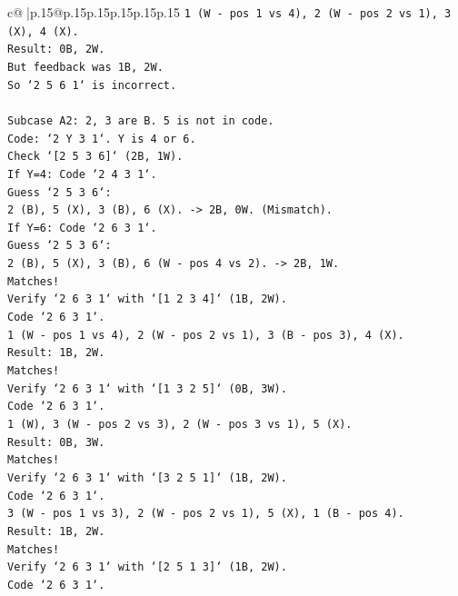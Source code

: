 \documentclass{article}
\begin{document}
{\begin{supertabular}{c@{$\;$}|p{.15\linewidth}@{}p{.15\linewidth}p{.15\linewidth}p{.15\linewidth}p{.15\linewidth}p{.15\linewidth}}
{{{\texttt{1 (W {-} pos 1 vs 4), 2 (W {-} pos 2 vs 1), 3 (X), 4 (X).} \\
\texttt{Result: 0B, 2W.} \\
\texttt{But feedback was 1B, 2W.} \\
\texttt{So `2 5 6 1` is incorrect.} \\
\\ 
\texttt{Subcase A2: 2, 3 are B. 5 is not in code.} \\
\texttt{Code: `2 Y 3 1`. Y is 4 or 6.} \\
\texttt{Check `{[}2 5 3 6{]}` (2B, 1W).} \\
\texttt{If Y=4: Code `2 4 3 1`.} \\
\texttt{Guess `2 5 3 6`:} \\
\texttt{2 (B), 5 (X), 3 (B), 6 (X). {-}> 2B, 0W. (Mismatch).} \\
\texttt{If Y=6: Code `2 6 3 1`.} \\
\texttt{Guess `2 5 3 6`:} \\
\texttt{2 (B), 5 (X), 3 (B), 6 (W {-} pos 4 vs 2). {-}> 2B, 1W.} \\
\texttt{Matches!} \\
\texttt{Verify `2 6 3 1` with `{[}1 2 3 4{]}` (1B, 2W).} \\
\texttt{Code `2 6 3 1`.} \\
\texttt{1 (W {-} pos 1 vs 4), 2 (W {-} pos 2 vs 1), 3 (B {-} pos 3), 4 (X).} \\
\texttt{Result: 1B, 2W.} \\
\texttt{Matches!} \\
\texttt{Verify `2 6 3 1` with `{[}1 3 2 5{]}` (0B, 3W).} \\
\texttt{Code `2 6 3 1`.} \\
\texttt{1 (W), 3 (W {-} pos 2 vs 3), 2 (W {-} pos 3 vs 1), 5 (X).} \\
\texttt{Result: 0B, 3W.} \\
\texttt{Matches!} \\
\texttt{Verify `2 6 3 1` with `{[}3 2 5 1{]}` (1B, 2W).} \\
\texttt{Code `2 6 3 1`.} \\
\texttt{3 (W {-} pos 1 vs 3), 2 (W {-} pos 2 vs 1), 5 (X), 1 (B {-} pos 4).} \\
\texttt{Result: 1B, 2W.} \\
\texttt{Matches!} \\
\texttt{Verify `2 6 3 1` with `{[}2 5 1 3{]}` (1B, 2W).} \\
\texttt{Code `2 6 3 1`.} \\
}}}
\end{supertabular}}
\end{document}
